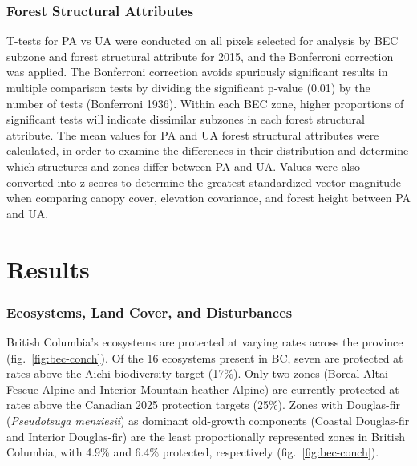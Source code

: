 \documentclass[10pt,oneside]{article}
\begin{document}
\hypertarget{forest-structural-attributes}{%
\subsubsection{Forest Structural
Attributes}\label{forest-structural-attributes}}

T-tests for PA vs UA were conducted on all pixels selected for analysis
by BEC subzone and forest structural attribute for 2015, and the
Bonferroni correction was applied. The Bonferroni correction avoids
spuriously significant results in multiple comparison tests by dividing
the significant p-value (0.01) by the number of tests (Bonferroni 1936).
Within each BEC zone, higher proportions of significant tests will
indicate dissimilar subzones in each forest structural attribute. The
mean values for PA and UA forest structural attributes were calculated,
in order to examine the differences in their distribution and determine
which structures and zones differ between PA and UA. Values were also
converted into z-scores to determine the greatest standardized vector
magnitude when comparing canopy cover, elevation covariance, and forest
height between PA and UA.

\hypertarget{results}{%
\section{Results}\label{results}}

\hypertarget{ecosystems-land-cover-and-disturbances-1}{%
\subsubsection{Ecosystems, Land Cover, and
Disturbances}\label{ecosystems-land-cover-and-disturbances-1}}

British Columbia's ecosystems are protected at varying rates across the
province (fig.~\ref{fig:bec-conch}). Of the 16 ecosystems present in BC,
seven are protected at rates above the Aichi biodiversity target (17\%).
Only two zones (Boreal Altai Fescue Alpine and Interior Mountain-heather
Alpine) are currently protected at rates above the Canadian 2025
protection targets (25\%). Zones with Douglas-fir (\emph{Pseudotsuga
menziesii}) as dominant old-growth components (Coastal Douglas-fir and
Interior Douglas-fir) are the least proportionally represented zones in
British Columbia, with 4.9\% and 6.4\% protected, respectively
(fig.~\ref{fig:bec-conch}).
\end{document}
